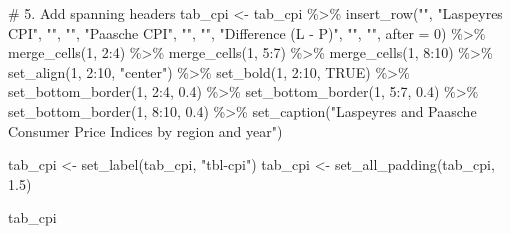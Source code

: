 \documentclass[
  letterpaper,
  DIV=11,
  numbers=noendperiod]{scrartcl}
\newenvironment{Shaded}{\begin{snugshade}}{\end{snugshade}}
\newcommand{\AttributeTok}[1]{\textcolor[rgb]{0.40,0.45,0.13}{#1}}
\newcommand{\CommentTok}[1]{\textcolor[rgb]{0.37,0.37,0.37}{#1}}
\newcommand{\ConstantTok}[1]{\textcolor[rgb]{0.56,0.35,0.01}{#1}}
\newcommand{\DecValTok}[1]{\textcolor[rgb]{0.68,0.00,0.00}{#1}}
\newcommand{\FloatTok}[1]{\textcolor[rgb]{0.68,0.00,0.00}{#1}}
\newcommand{\FunctionTok}[1]{\textcolor[rgb]{0.28,0.35,0.67}{#1}}
\newcommand{\NormalTok}[1]{\textcolor[rgb]{0.00,0.23,0.31}{#1}}
\newcommand{\OtherTok}[1]{\textcolor[rgb]{0.00,0.23,0.31}{#1}}
\newcommand{\SpecialCharTok}[1]{\textcolor[rgb]{0.37,0.37,0.37}{#1}}
\newcommand{\StringTok}[1]{\textcolor[rgb]{0.13,0.47,0.30}{#1}}
\begin{document}
\begin{Shaded}
\begin{Highlighting}[]
\CommentTok{\# 5. Add spanning headers}
\NormalTok{tab\_cpi }\OtherTok{\textless{}{-}}\NormalTok{ tab\_cpi }\SpecialCharTok{\%\textgreater{}\%}
  \FunctionTok{insert\_row}\NormalTok{(}\StringTok{""}\NormalTok{, }\StringTok{"Laspeyres CPI"}\NormalTok{, }\StringTok{""}\NormalTok{, }\StringTok{""}\NormalTok{, }\StringTok{"Paasche CPI"}\NormalTok{, }\StringTok{""}\NormalTok{, }\StringTok{""}\NormalTok{, }\StringTok{"Difference (L {-} P)"}\NormalTok{, }\StringTok{""}\NormalTok{, }\StringTok{""}\NormalTok{, }\AttributeTok{after =} \DecValTok{0}\NormalTok{) }\SpecialCharTok{\%\textgreater{}\%}
  \FunctionTok{merge\_cells}\NormalTok{(}\DecValTok{1}\NormalTok{, }\DecValTok{2}\SpecialCharTok{:}\DecValTok{4}\NormalTok{) }\SpecialCharTok{\%\textgreater{}\%}
  \FunctionTok{merge\_cells}\NormalTok{(}\DecValTok{1}\NormalTok{, }\DecValTok{5}\SpecialCharTok{:}\DecValTok{7}\NormalTok{) }\SpecialCharTok{\%\textgreater{}\%}
  \FunctionTok{merge\_cells}\NormalTok{(}\DecValTok{1}\NormalTok{, }\DecValTok{8}\SpecialCharTok{:}\DecValTok{10}\NormalTok{) }\SpecialCharTok{\%\textgreater{}\%}
  \FunctionTok{set\_align}\NormalTok{(}\DecValTok{1}\NormalTok{, }\DecValTok{2}\SpecialCharTok{:}\DecValTok{10}\NormalTok{, }\StringTok{"center"}\NormalTok{) }\SpecialCharTok{\%\textgreater{}\%}
  \FunctionTok{set\_bold}\NormalTok{(}\DecValTok{1}\NormalTok{, }\DecValTok{2}\SpecialCharTok{:}\DecValTok{10}\NormalTok{, }\ConstantTok{TRUE}\NormalTok{) }\SpecialCharTok{\%\textgreater{}\%}
  \FunctionTok{set\_bottom\_border}\NormalTok{(}\DecValTok{1}\NormalTok{, }\DecValTok{2}\SpecialCharTok{:}\DecValTok{4}\NormalTok{, }\FloatTok{0.4}\NormalTok{) }\SpecialCharTok{\%\textgreater{}\%}
  \FunctionTok{set\_bottom\_border}\NormalTok{(}\DecValTok{1}\NormalTok{, }\DecValTok{5}\SpecialCharTok{:}\DecValTok{7}\NormalTok{, }\FloatTok{0.4}\NormalTok{) }\SpecialCharTok{\%\textgreater{}\%}
  \FunctionTok{set\_bottom\_border}\NormalTok{(}\DecValTok{1}\NormalTok{, }\DecValTok{8}\SpecialCharTok{:}\DecValTok{10}\NormalTok{, }\FloatTok{0.4}\NormalTok{) }\SpecialCharTok{\%\textgreater{}\%}
  \FunctionTok{set\_caption}\NormalTok{(}\StringTok{"Laspeyres and Paasche Consumer Price Indices by region and year"}\NormalTok{)}

\NormalTok{tab\_cpi }\OtherTok{\textless{}{-}} \FunctionTok{set\_label}\NormalTok{(tab\_cpi, }\StringTok{"tbl{-}cpi"}\NormalTok{)}
\NormalTok{tab\_cpi }\OtherTok{\textless{}{-}} \FunctionTok{set\_all\_padding}\NormalTok{(tab\_cpi, }\FloatTok{1.5}\NormalTok{)}

\NormalTok{tab\_cpi}
\end{Highlighting}
\end{Shaded}
\end{document}
